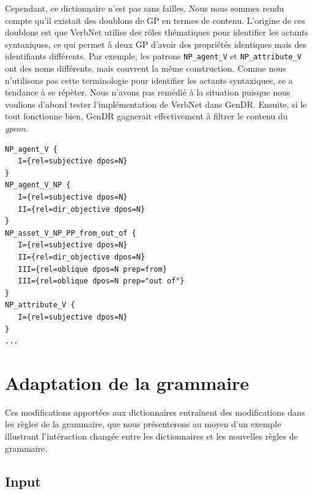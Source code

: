 Cependant, ce dictionnaire n'est pas sans failles. Nous nous sommes rendu compte qu'il existait des doublons de \ac{GP} en termes de contenu. L'origine de ces doublons est que VerbNet utilise des rôles thématiques pour identifier les actants syntaxiques, ce qui permet à deux \ac{GP} d'avoir des propriétés identiques mais des identifiants différents. Par exemple, les patrons \texttt{NP\_agent\_V} et \texttt{NP\_attribute\_V} ont des noms différents, mais couvrent la même construction. Comme nous n'utilisons pas cette terminologie pour identifier les actants syntaxiques, ce  a tendance à se répèter. Nous n'avons pas remédié à la situation puisque nous voulions d'abord tester l'implémentation de VerbNet dans GenDR. Ensuite, si le tout fonctionne bien, GenDR gagnerait effectivement à filtrer le contenu du \emph{gpcon}.

\begin{lstlisting}[language=mate, caption = Extrait du \emph{gpcon}]
NP_agent_V {
   I={rel=subjective dpos=N}
}
NP_agent_V_NP {
   I={rel=subjective dpos=N}
   II={rel=dir_objective dpos=N}
}
NP_asset_V_NP_PP_from_out_of {
   I={rel=subjective dpos=N}
   II={rel=dir_objective dpos=N}
   III={rel=oblique dpos=N prep=from}
   III={rel=oblique dpos=N prep="out of"}
}
NP_attribute_V {
   I={rel=subjective dpos=N}
}
...
\end{lstlisting}

\section{Adaptation de la grammaire}


Ces modifications apportées aux dictionnaires entraînent des modifications dans les règles de la grammaire, que nous présenterons au moyen d'un exemple illustrant l'intéraction changée entre les dictionnaires et les nouvelles règles de grammaire.

\subsection{Input}

